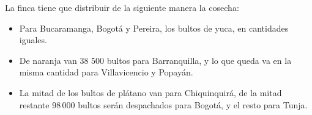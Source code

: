 \documentclass[letterpaper,11pt,twoside]{article}
\begin{document}
La finca tiene que distribuir de la siguiente manera la cosecha:
\begin{itemize}
\item Para Bucaramanga, Bogotá y Pereira, los bultos de yuca, en cantidades iguales.
\item De naranja van 38 500 bultos para Barranquilla, y lo que queda va en la misma cantidad para Villavicencio y Popayán.
\item La mitad de los bultos de plátano van para Chiquinquirá, de la mitad restante 98\,000 bultos serán despachados para Bogotá, y el resto para Tunja.
\end{itemize}
\end{document}
